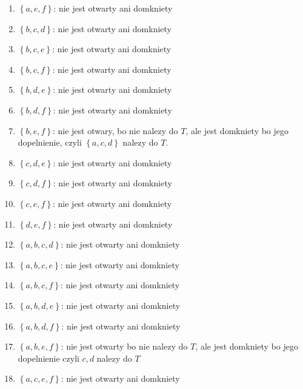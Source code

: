 \documentclass{article}
\begin{document}
\begin{enumerate}
\begin{enumerate}[label=\arabic*.]
            \item $\left\{ a,e,f \right\}$: nie jest otwarty ani domkniety

            \item $\left\{ b,c,d \right\}$: nie jest otwarty ani domkniety
            \item $\left\{ b,c,e \right\}$: nie jest otwarty ani domkniety
            \item $\left\{ b,c,f \right\}$: nie jest otwarty ani domkniety

            \item $\left\{ b,d,e \right\}$: nie jest otwarty ani domkniety
            \item $\left\{ b,d,f \right\}$: nie jest otwarty ani domkniety

            \item $\left\{ b,e,f \right\}$: nie jest otwary, bo nie nalezy do $T$, ale jest domkniety bo jego dopelnienie, czyli $\left\{ a,c,d \right\}$ nalezy do $T$.

            \item $\left\{ c,d,e \right\}$: nie jest otwarty ani domkniety
            \item $\left\{ c,d,f \right\}$: nie jest otwarty ani domkniety

            \item $\left\{ c,e,f \right\}$: nie jest otwarty ani domkniety

            \item $\left\{ d,e,f \right\}$: nie jest otwarty ani domkniety

            \item $\left\{ a,b,c,d \right\}$: nie jest otwarty ani domkniety
            \item $\left\{ a,b,c,e \right\}$: nie jest otwarty ani domkniety
            \item $\left\{ a,b,c,f \right\}$: nie jest otwarty ani domkniety

            \item $\left\{ a,b,d,e \right\}$: nie jest otwarty ani domkniety
            \item $\left\{ a,b,d,f \right\}$: nie jest otwarty ani domkniety

            \item $\left\{ a,b,e,f \right\}$: nie jest otwarty bo nie nalezy do $T$, ale jest domkniety bo jego dopelnienie czyli ${c,d}$ nalezy do $T$

            \item $\left\{ a,c,e,f \right\}$: nie jest otwarty ani domkniety 


\end{enumerate}
\end{enumerate}
\end{document}
